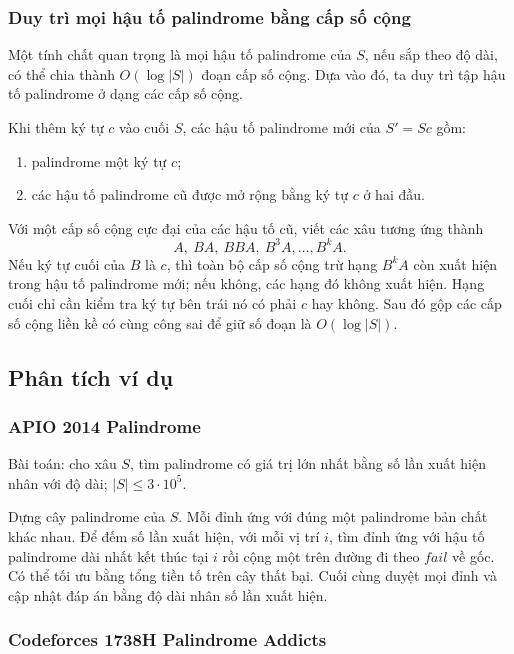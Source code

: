 \documentclass[11pt]{article}
\begin{document}
\subsubsection{Duy trì mọi hậu tố palindrome bằng cấp số cộng}

Một tính chất quan trọng là mọi hậu tố palindrome của $S$, nếu sắp theo độ dài,
có thể chia thành $O(\log |S|)$ đoạn cấp số cộng. Dựa vào đó, ta duy trì tập hậu
tố palindrome ở dạng các cấp số cộng.

Khi thêm ký tự $c$ vào cuối $S$, các hậu tố palindrome mới của $S'=Sc$ gồm:
\begin{enumerate}
  \item palindrome một ký tự $c$;
  \item các hậu tố palindrome cũ được mở rộng bằng ký tự $c$ ở hai đầu.
\end{enumerate}
Với một cấp số cộng cực đại của các hậu tố cũ, viết các xâu tương ứng thành
\[
  A,\ BA,\ BBA,\ B^3A,\ldots,B^kA.
\]
Nếu ký tự cuối của $B$ là $c$, thì toàn bộ cấp số cộng trừ hạng $B^kA$ còn xuất
hiện trong hậu tố palindrome mới; nếu không, các hạng đó không xuất hiện. Hạng
cuối chỉ cần kiểm tra ký tự bên trái nó có phải $c$ hay không. Sau đó gộp các
cấp số cộng liền kề có cùng công sai để giữ số đoạn là $O(\log |S|)$.

\subsection{Phân tích ví dụ}

\subsubsection{APIO 2014 Palindrome}

Bài toán: cho xâu $S$, tìm palindrome có giá trị lớn nhất bằng số lần xuất hiện
nhân với độ dài; $|S|\le 3\cdot 10^5$.

Dựng cây palindrome của $S$. Mỗi đỉnh ứng với đúng một palindrome bản chất khác
nhau. Để đếm số lần xuất hiện, với mỗi vị trí $i$, tìm đỉnh ứng với hậu tố
palindrome dài nhất kết thúc tại $i$ rồi cộng một trên đường đi theo
$\mathit{fail}$ về gốc. Có thể tối ưu bằng tổng tiền tố trên cây thất bại. Cuối
cùng duyệt mọi đỉnh và cập nhật đáp án bằng độ dài nhân số lần xuất hiện.

\subsubsection{Codeforces 1738H Palindrome Addicts}
\end{document}
